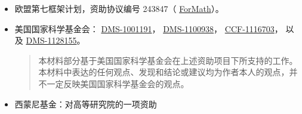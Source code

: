 {\begin{itemize}
\item 欧盟第七框架计划，资助协议编号 243847（%
\href{http://wiki.portal.chalmers.se/cse/pmwiki.php/ForMath/ForMath/}{ForMath}）。 %

\item 美国国家科学基金会：
  \href{http://www.nsf.gov/awardsearch/showAward.do?AwardNumber=1001191}{DMS-1001191}， %
  \href{http://www.nsf.gov/awardsearch/showAward.do?AwardNumber=1100938}{DMS-1100938}， %
  \href{http://www.nsf.gov/awardsearch/showAward.do?AwardNumber=1116703}{CCF-1116703}， %
  以及
  \href{http://www.nsf.gov/awardsearch/showAward.do?AwardNumber=1128155}{DMS-1128155}。 %
  {
    \setlength{\itemsep}{0pt}
    \begin{quote}
      \noindent\scriptsize
      本材料部分基于美国国家科学基金会在上述资助项目下所支持的工作。
      本材料中表达的任何观点、发现和结论或建议均为作者本人的观点，并不一定反映美国国家科学基金会的观点。
    \end{quote}
  }
\item 西蒙尼基金：对高等研究院的一项资助          %
  \end{itemize}


}
\cleartooddpage

